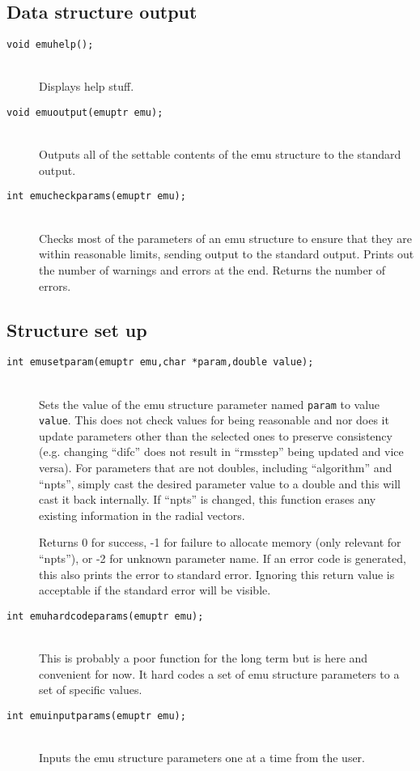\documentclass {book}
\newcommand {\ttt} {\texttt}
\begin{document}
\subsection{Data structure output}

\begin{description}

\item[\ttt{void emuhelp();}]
\hfill \\
Displays help stuff.

\item[\ttt{void emuoutput(emuptr emu);}]
\hfill \\
Outputs all of the settable contents of the emu structure to the standard output.

\item[\ttt{int emucheckparams(emuptr emu);}]
\hfill \\
Checks most of the parameters of an emu structure to ensure that they are within reasonable limits, sending output to the standard output. Prints out the number of warnings and errors at the end. Returns the number of errors.

\end{description}

\subsection{Structure set up}

\begin{description}

\item[\ttt{int emusetparam(emuptr emu,char *param,double value);}]
\hfill \\
Sets the value of the emu structure parameter named \ttt{param} to value \ttt{value}. This does not check values for being reasonable and nor does it update parameters other than the selected ones to preserve consistency (e.g. changing ``difc'' does not result in ``rmsstep'' being updated and vice versa). For parameters that are not doubles, including ``algorithm'' and ``npts'', simply cast the desired parameter value to a double and this will cast it back internally. If ``npts'' is changed, this function erases any existing information in the radial vectors.

Returns 0 for success, -1 for failure to allocate memory (only relevant for ``npts''), or -2 for unknown parameter name.  If an error code is generated, this also prints the error to standard error. Ignoring this return value is acceptable if the standard error will be visible.

\item[\ttt{int emuhardcodeparams(emuptr emu);}]
\hfill \\
This is probably a poor function for the long term but is here and convenient for now. It hard codes a set of emu structure parameters to a set of specific values.

\item[\ttt{int emuinputparams(emuptr emu);}]
\hfill \\
Inputs the emu structure parameters one at a time from the user.

\end{description}
\end{document}
